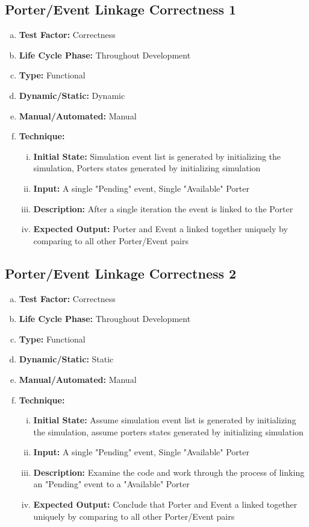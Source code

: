\documentclass[paper=letter, fontsize=10pt]{scrartcl}
\numberwithin{equation}{section}		%
\numberwithin{figure}{section}			%
\numberwithin{table}{section}				%
\begin{document}
\subsection{Porter/Event Linkage Correctness 1}
\begin{enumerate}[(a)] 	
	\item \textbf{Test Factor:} Correctness 
	\item \textbf{Life Cycle Phase:} Throughout Development
	\item \textbf{Type:} Functional
	\item \textbf{Dynamic/Static:} Dynamic
	\item \textbf{Manual/Automated:} Manual
	\item \textbf{Technique:}
		\begin{enumerate}[(i)]
			\item \textbf{Initial State:} Simulation event list is generated by initializing the simulation, Porters states generated by initializing simulation
			\item \textbf{Input:} A single "Pending" event, Single "Available" Porter
			\item \textbf{Description:} After a single iteration the event is linked to the Porter
			\item \textbf{Expected Output:} Porter and Event a linked together uniquely by comparing to all other Porter/Event pairs
		\end{enumerate}
\end{enumerate}

\subsection{Porter/Event Linkage Correctness 2}
\begin{enumerate}[(a)] 	
	\item \textbf{Test Factor:} Correctness 
	\item \textbf{Life Cycle Phase:} Throughout Development
	\item \textbf{Type:} Functional
	\item \textbf{Dynamic/Static:} Static
	\item \textbf{Manual/Automated:} Manual
	\item \textbf{Technique:}
		\begin{enumerate}[(i)]
			\item \textbf{Initial State:} Assume simulation event list is generated by initializing the simulation, assume porters states generated by initializing simulation
			\item \textbf{Input:} A single "Pending" event, Single "Available" Porter
			\item \textbf{Description:} Examine the code and work through the process of linking an "Pending" event to a "Available" Porter
			\item \textbf{Expected Output:} Conclude that Porter and Event a linked together uniquely by comparing to all other Porter/Event pairs
		\end{enumerate}
\end{enumerate}
\end{document}
